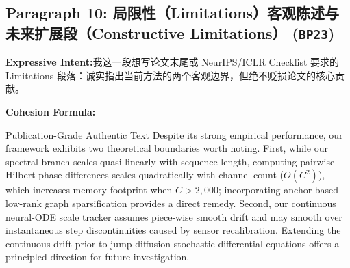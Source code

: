 \subsection*{Paragraph 10: 局限性（Limitations）客观陈述与未来扩展段（Constructive Limitations） (\texttt{BP23})}
\noindent\textbf{Expressive Intent:}\enspace 我这一段想写论文末尾或 NeurIPS/ICLR Checklist 要求的 Limitations 段落：诚实指出当前方法的两个客观边界，但绝不贬损论文的核心贡献。\par
\noindent\textbf{Cohesion Formula:}\par\vspace{4pt}
\begin{ExampleBox}{Publication-Grade Authentic Text}
Despite its strong empirical performance, our framework exhibits two theoretical boundaries worth noting. First, while our spectral branch scales quasi-linearly with sequence length, computing pairwise Hilbert phase differences scales quadratically with channel count ($O(C^2)$), which increases memory footprint when $C > 2,000$; incorporating anchor-based low-rank graph sparsification provides a direct remedy. Second, our continuous neural-ODE scale tracker assumes piece-wise smooth drift and may smooth over instantaneous step discontinuities caused by sensor recalibration. Extending the continuous drift prior to jump-diffusion stochastic differential equations offers a principled direction for future investigation.
\end{ExampleBox}
